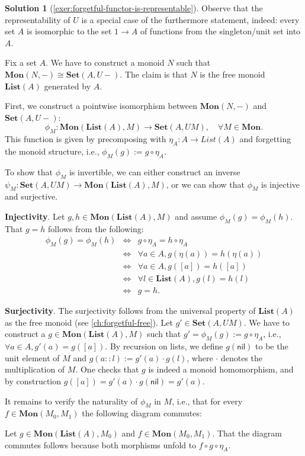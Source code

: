 \documentclass[a4paper,11pt, oneside,titlepage=false]{scrbook}
\theoremstyle{plain}
\theoremstyle{definition}
\newtheorem{solution}[thm]{Solution}
\newcommand{\Catb}[1]{\mathbf{#1}}
\newcommand{\List}{\Catb{List}}
\newcommand{\SET}{\Catb{Set}}
\newcommand{\MON}{\Catb{Mon}}
\newcommand{\nil}{\ensuremath{\mathsf{nil}}}
\begin{document}
\begin{solution}[\cref{exer:forgetful-functor-is-representable}]\label{sol:forgetful-functor-is-representable}
Observe that the representability of $U$ is a special case of the furthermore statement, indeed: every set $A$ is isomorphic to the set $1 \to A$ of functions from the singleton/unit set into $A$.

Fix a set $A$.
We have to construct a monoid $N$ such that $\MON(N,-) \cong \SET(A,U-)$.
The claim is that $N$ is the free monoid $\List(A)$ generated by $A$.

First, we construct a pointwise isomorphism between $\MON(N,-)$ and $\SET(A,U-)$:
\[
\phi_M : \MON(\List(A), M) \to \SET(A, UM), \quad \forall M \in \MON.
\]
This function is given by precomposing with $\eta_A : A \to List(A)$ and forgetting the monoid structure, i.e., $\phi_M(g) := g \circ \eta_A$.

To show that $\phi_M$ is invertible, we can either construct an inverse $\psi_M : \SET(A, UM) \to \MON(\List(A), M)$, or we can show that $\phi_M$ is injective and surjective.

\textbf{Injectivity}. Let $g, h \in \MON(\List(A), M)$ and assume $\phi_M(g) = \phi_M(h)$.
That $g = h$ follows from the following:
\begin{eqnarray*}
\phi_M(g) = \phi_M(h) &\Leftrightarrow& g \circ \eta_A = h \circ \eta_A \\
&\Leftrightarrow& \forall a \in A, g(\eta(a)) = h(\eta(a)) \\
&\Leftrightarrow& \forall a \in A, g([a]) = h([a])\\
&\Leftrightarrow& \forall l \in \List(A), g(l) = h(l)\\
&\Leftrightarrow& g = h.
\end{eqnarray*}

\textbf{Surjectivity}.
The surjectivity follows from the universal property of $\List(A)$ as the free monoid (see \cref{ch:forgetful-free}).
Let $g' \in \SET(A, UM)$.
We have to construct a $g \in \MON(\List(A), M)$ such that
$g' = \phi_M(g) := g \circ \eta_A$, i.e., $\forall a \in A, g'(a) = g([a])$.
By recursion on lists, we define $g(\nil)$ to be the unit element of $M$ and
$g(a :: l) := g'(a) \cdot g(l)$, where $\cdot$ denotes the multiplication of $M$.
One checks that $g$ is indeed a monoid homomorphism, and by construction
$g([a]) = g'(a) \cdot g(\nil) = g'(a)$.

It remains to verify the naturality of $\phi_M$ in $M$, i.e., that for every $f \in \MON(M_0,M_1)$ the following diagram commutes:
\begin{center}
\end{center}
Let $g \in \MON(\List(A), M_0)$ and $f \in \MON(M_0,M_1)$.
That the diagram commutes follows because both morphisms unfold to $f \circ g \circ \eta_A$.
\end{solution}
\end{document}
